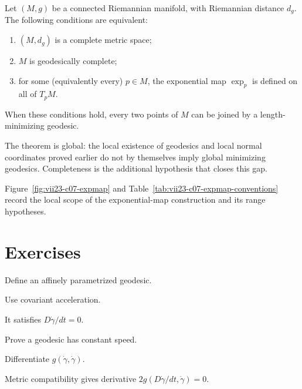 \begin{theorem}\label{thm:vii23-hopf-rinow}
Let \((M,g)\) be a connected Riemannian manifold, with Riemannian distance \(d_g\).
The following conditions are equivalent:
\begin{enumerate}
\item \((M,d_g)\) is a complete metric space;
\item \(M\) is geodesically complete;
\item for some (equivalently every) \(p\in M\), the exponential map
      \(\exp_p\) is defined on all of \(T_pM\).
\end{enumerate}
When these conditions hold, every two points of \(M\) can be joined by a
length-minimizing geodesic.
\end{theorem}

\begin{remark}
The theorem is global: the local existence of geodesics and local normal
coordinates proved earlier do not by themselves imply global minimizing
geodesics.  Completeness is the additional hypothesis that closes this gap.
\end{remark}


Figure~\ref{fig:vii23-c07-expmap} and Table~\ref{tab:vii23-c07-expmap-conventions}
record the local scope of the exponential-map construction and its range hypotheses.


\section{Exercises}

\begin{exercise}\label{exr:vii23-01}
Define an affinely parametrized geodesic.
\end{exercise}
\begin{hint}
Use covariant acceleration.
\end{hint}
\begin{solution}
It satisfies \(D\dot\gamma/dt=0\).
\end{solution}


\begin{exercise}\label{exr:vii23-02}
Prove a geodesic has constant speed.
\end{exercise}
\begin{hint}
Differentiate \(g(\dot\gamma,\dot\gamma)\).
\end{hint}
\begin{solution}
Metric compatibility gives derivative \(2g(D\dot\gamma/dt,\dot\gamma)=0\).
\end{solution}


